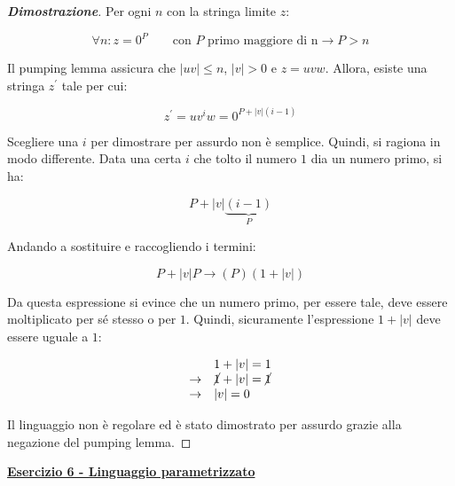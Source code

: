 \documentclass[a4paper]{article}
\begin{document}
	\begin{proof}[\textcolor{Blue3}{\textbf{Dimostrazione}}]
		Per ogni $n$ con la stringa limite $z$:
		
		\begin{equation*}
			\forall n : z = 0^{P} \hspace{2em} \text{con } P \text{ primo maggiore di n} \rightarrow P > n
		\end{equation*}
	
		\noindent
		Il pumping lemma assicura che $|uv| \le n$, $|v| > 0$ e $z = uvw$. Allora, esiste una stringa $z^{'}$ tale per cui:
		
		\begin{equation*}
			z^{'} = uv^{i}w = 0^{P + |v|\left(i-1\right)}
		\end{equation*}
	
		\noindent
		Scegliere una $i$ per dimostrare per assurdo non è semplice. Quindi, si ragiona in modo differente. Data una certa $i$ che tolto il numero $1$ dia un numero primo, si ha:
		
		\begin{equation*}
			P + |v| \underbrace{\left(i - 1\right)}_{P}
		\end{equation*}
	
		\noindent
		Andando a sostituire e raccogliendo i termini:
		
		\begin{equation*}
			P + |v|P \longrightarrow \left(P\right) \left(1 + |v|\right)
		\end{equation*}
	
		\noindent
		Da questa espressione si evince che un numero primo, per essere tale, deve essere moltiplicato per sé stesso o per $1$. Quindi, sicuramente l'espressione $1 + |v|$ deve essere uguale a $1$:
		
		\begin{equation*}
			\begin{array}{cl}
				& 1 + |v| = 1 \\
				\rightarrow & \cancel{1} + |v| = \cancel{1} \\
				\rightarrow & |v| = 0
			\end{array}
		\end{equation*}
	
		\noindent
		Il linguaggio non è regolare ed è stato dimostrato per assurdo grazie alla negazione del pumping lemma.
	\end{proof}

	\newpage
	
	\noindent
	\textcolor{Red3}{\textbf{\underline{Esercizio 6 - Linguaggio parametrizzato}}}\newline
	
\end{document}

